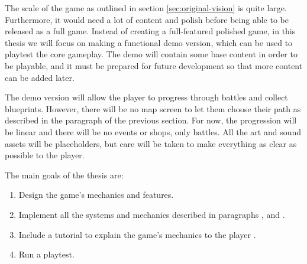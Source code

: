 The scale of the game as outlined in section \ref{sec:original-vision} is quite large.
Furthermore, it would need a lot of content and polish before being able to be released as a full game.
Instead of creating a full-featured polished game, in this thesis we will focus on making a functional demo version, which can be used to playtest the core gameplay.
The demo will contain some base content in order to be playable, and it must be prepared for future development so that more content can be added later.

The demo version will allow the player to progress through battles and collect blueprints.
However, there will be no map screen to let them choose their path as described in the paragraph  of the previous section.
For now, the progression will be linear and there will be no events or shops, only battles.
All the art and sound assets will be placeholders, but care will be taken to make everything as clear as possible to the player.

\hfill\break
The main goals of the thesis are:
\begin{enumerate}
    \item Design the game's mechanics and features.
    \item Implement all the systems and mechanics described in paragraphs ,  and .
    \item Include a tutorial to explain the game's mechanics to the player .
    \item Run a playtest.
\end{enumerate}
